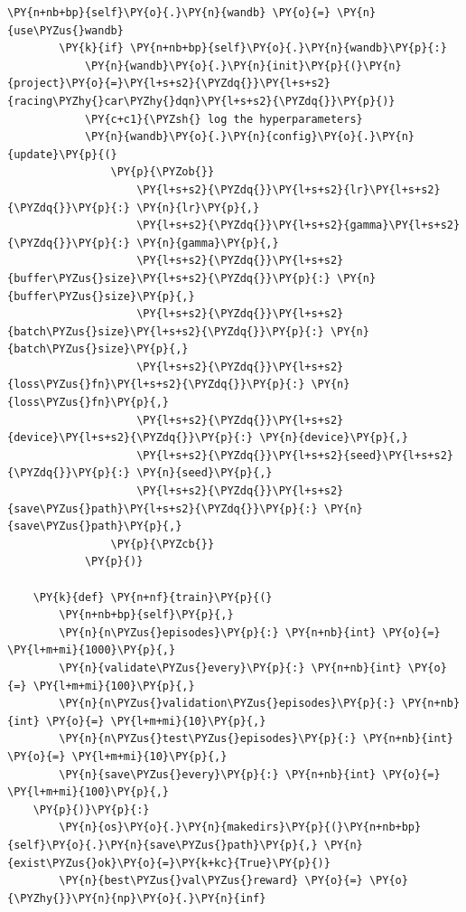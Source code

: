 \documentclass{article}
\begin{document}
\begin{Verbatim}[commandchars=\\\{\}]
        \PY{n+nb+bp}{self}\PY{o}{.}\PY{n}{wandb} \PY{o}{=} \PY{n}{use\PYZus{}wandb}
        \PY{k}{if} \PY{n+nb+bp}{self}\PY{o}{.}\PY{n}{wandb}\PY{p}{:}
            \PY{n}{wandb}\PY{o}{.}\PY{n}{init}\PY{p}{(}\PY{n}{project}\PY{o}{=}\PY{l+s+s2}{\PYZdq{}}\PY{l+s+s2}{racing\PYZhy{}car\PYZhy{}dqn}\PY{l+s+s2}{\PYZdq{}}\PY{p}{)}
            \PY{c+c1}{\PYZsh{} log the hyperparameters}
            \PY{n}{wandb}\PY{o}{.}\PY{n}{config}\PY{o}{.}\PY{n}{update}\PY{p}{(}
                \PY{p}{\PYZob{}}
                    \PY{l+s+s2}{\PYZdq{}}\PY{l+s+s2}{lr}\PY{l+s+s2}{\PYZdq{}}\PY{p}{:} \PY{n}{lr}\PY{p}{,}
                    \PY{l+s+s2}{\PYZdq{}}\PY{l+s+s2}{gamma}\PY{l+s+s2}{\PYZdq{}}\PY{p}{:} \PY{n}{gamma}\PY{p}{,}
                    \PY{l+s+s2}{\PYZdq{}}\PY{l+s+s2}{buffer\PYZus{}size}\PY{l+s+s2}{\PYZdq{}}\PY{p}{:} \PY{n}{buffer\PYZus{}size}\PY{p}{,}
                    \PY{l+s+s2}{\PYZdq{}}\PY{l+s+s2}{batch\PYZus{}size}\PY{l+s+s2}{\PYZdq{}}\PY{p}{:} \PY{n}{batch\PYZus{}size}\PY{p}{,}
                    \PY{l+s+s2}{\PYZdq{}}\PY{l+s+s2}{loss\PYZus{}fn}\PY{l+s+s2}{\PYZdq{}}\PY{p}{:} \PY{n}{loss\PYZus{}fn}\PY{p}{,}
                    \PY{l+s+s2}{\PYZdq{}}\PY{l+s+s2}{device}\PY{l+s+s2}{\PYZdq{}}\PY{p}{:} \PY{n}{device}\PY{p}{,}
                    \PY{l+s+s2}{\PYZdq{}}\PY{l+s+s2}{seed}\PY{l+s+s2}{\PYZdq{}}\PY{p}{:} \PY{n}{seed}\PY{p}{,}
                    \PY{l+s+s2}{\PYZdq{}}\PY{l+s+s2}{save\PYZus{}path}\PY{l+s+s2}{\PYZdq{}}\PY{p}{:} \PY{n}{save\PYZus{}path}\PY{p}{,}
                \PY{p}{\PYZcb{}}
            \PY{p}{)}

    \PY{k}{def} \PY{n+nf}{train}\PY{p}{(}
        \PY{n+nb+bp}{self}\PY{p}{,}
        \PY{n}{n\PYZus{}episodes}\PY{p}{:} \PY{n+nb}{int} \PY{o}{=} \PY{l+m+mi}{1000}\PY{p}{,}
        \PY{n}{validate\PYZus{}every}\PY{p}{:} \PY{n+nb}{int} \PY{o}{=} \PY{l+m+mi}{100}\PY{p}{,}
        \PY{n}{n\PYZus{}validation\PYZus{}episodes}\PY{p}{:} \PY{n+nb}{int} \PY{o}{=} \PY{l+m+mi}{10}\PY{p}{,}
        \PY{n}{n\PYZus{}test\PYZus{}episodes}\PY{p}{:} \PY{n+nb}{int} \PY{o}{=} \PY{l+m+mi}{10}\PY{p}{,}
        \PY{n}{save\PYZus{}every}\PY{p}{:} \PY{n+nb}{int} \PY{o}{=} \PY{l+m+mi}{100}\PY{p}{,}
    \PY{p}{)}\PY{p}{:}
        \PY{n}{os}\PY{o}{.}\PY{n}{makedirs}\PY{p}{(}\PY{n+nb+bp}{self}\PY{o}{.}\PY{n}{save\PYZus{}path}\PY{p}{,} \PY{n}{exist\PYZus{}ok}\PY{o}{=}\PY{k+kc}{True}\PY{p}{)}
        \PY{n}{best\PYZus{}val\PYZus{}reward} \PY{o}{=} \PY{o}{\PYZhy{}}\PY{n}{np}\PY{o}{.}\PY{n}{inf}


\end{Verbatim}
\end{document}
